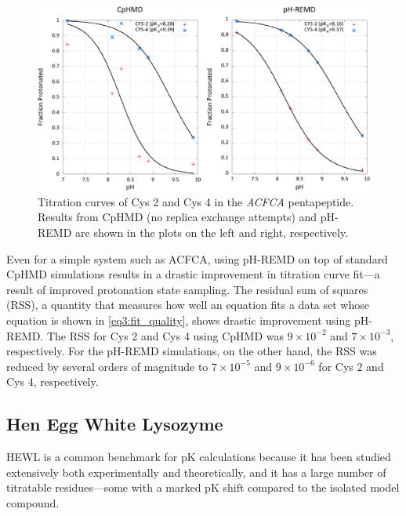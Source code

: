\begin{figure}
   \includegraphics[width=6.5in]{ACFCA_Titration_Curves.eps}
   \caption{Titration curves of Cys 2 and Cys 4 in the \emph{ACFCA}
            pentapeptide. Results from CpHMD (no replica exchange attempts) and
            pH-REMD are shown in the plots on the left and right, respectively.}
   \label{fig4:acfca_titration_curves}
\end{figure}

Even for a simple system such as ACFCA, using pH-REMD on top of standard CpHMD
simulations results in a drastic improvement in titration curve fit---a result
of improved protonation state sampling. The residual sum of squares (RSS), a
quantity that measures how well an equation fits a data set whose equation is
shown in \ref{eq3:fit_quality}, shows drastic improvement using pH-REMD. The RSS
for Cys 2 and Cys 4 using CpHMD was $9 \times 10 ^ {-2}$ and $7 \times 10 ^
{-3}$, respectively. For the pH-REMD simulations, on the other hand, the RSS was
reduced by several orders of magnitude to $7 \times 10 ^ {-5}$ and $9 \times 10
^ {-6}$ for Cys 2 and Cys 4, respectively.

\subsection{Hen Egg White Lysozyme}

HEWL is a common benchmark for pK calculations because it has been
studied extensively both experimentally
\cite{Takahashi_Biopolymers_1992_v32_p897, Bartik_BiophysJ_1994_v66_p1180,
Webb_Proteins_2011_v79_p685} and theoretically,
\cite{Mongan_JComputChem_2004_v25_p2038, Demchuk_JPhysChem_1996_v100_p17373,
Williams_JChemTheoryComput_2010_v6_p560, Machuqueiro_Proteins_2008_v72_p289,
Swails_JChemTheoryComput_2012_v8_p4393, Wallace_JChemTheoryComput_2011_v7_p2617}
and it has a large number of titratable residues---some with a marked pK
shift compared to the isolated model compound.

